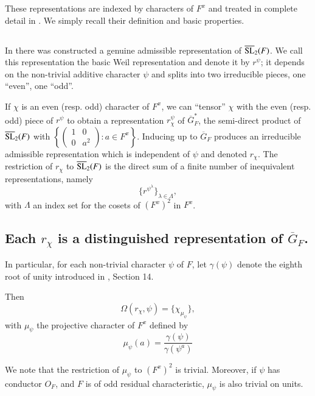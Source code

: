 These representations are indexed by characters of $F^{x}$ and treated in complete detail in \cite{GePS2}. We simply recall their definition and basic properties.

\subsection{}\label{art1-sec4.1}
In \cite{Weil} there was constructed a genuine admissible representation of $\overline{\mathrm{SL}}_{2}(F)$. We call this representation the basic Weil representation and denote it by $r^{\psi}$; it depends on the non-trivial additive character $\psi$ and splits into two irreducible pieces, one ``even'', one ``odd''.

If $\chi$ is an even (resp. odd) character of $F^{x}$, we can ``tensor'' $\chi$ with the even (resp. odd) piece of $r^{\psi}$ to obtain a representation $r^{\psi}_{\chi}$ of $\overline{G}_{F}^{*}$, the semi-direct product of $\overline{\mathrm{SL}}_{2}(F)$ with $\left\{\left(\begin{smallmatrix} 1 & 0\\ 0 & a^{2}\end{smallmatrix}\right):a\in F^{x}\right\}$. Inducing up to $\overline{G}_{F}$ produces an irreducible admissible representation which is independent of $\psi$ and denoted $r_{\chi}$. The restriction of $r_{\chi}$ to $\overline{\mathrm{SL}}_{2}(F)$ is the direct sum of a finite number of inequivalent representations, namely
$$
\{r^{\psi^{\lambda}}\}_{\lambda\in \Lambda},
$$
with $\Lambda$ an index set for the cosets of $(F^{x})^{2}$ in $F^{x}$.

\subsection{Each $r_{\chi}$ is a distinguished representation of $\overline{G}_{F}$.}\label{art1-sec4.2}
In particular, for each non-trivial character $\psi$ of $F$, let $\gamma(\psi)$ denote the eighth root of unity introduced in \cite{Weil}, Section 14.

Then
$$
\Omega(r_{\chi},\psi)=\{\chi_{\mu_{\psi}}\},
$$
with $\mu_{\psi}$ the projective character of $F^{x}$ defined by
\setcounter{equation}{0}
\begin{equation}
\mu_{\psi}(a)=\dfrac{\gamma(\psi)}{\gamma(\psi^{a})}\label{art1-eq4.2.1}
\end{equation}

We note that the restriction of $\mu_{\psi}$ to $(F^{x})^{2}$ is trivial. Moreover, if $\psi$ has conductor $O_{F}$, and $F$ is of odd residual characteristic, $\mu_{\psi}$ is also trivial on units.

